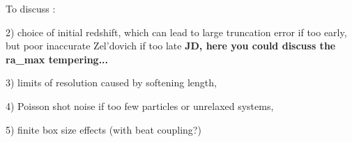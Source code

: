 To discuss : 

2) choice of initial redshift, which can lead to large truncation error if too early, but poor inaccurate Zel'dovich if too late 
{\bf JD, here you could discuss the ra\_max tempering...} 

3) limits of resolution caused by softening length,

4) Poisson shot noise if too few particles or unrelaxed systems, 

5) finite box size effects (with beat coupling?)
 


